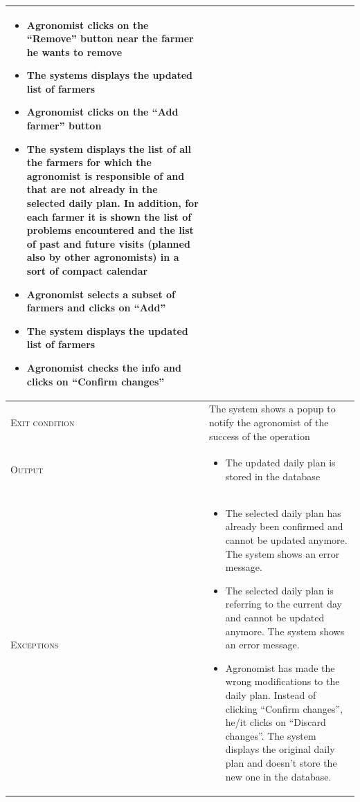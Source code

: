 \begin{table}[H]
\begin{tabular}[c]{|l|p{}|}
\begin{itemize}
                                    		\item Agronomist clicks on the “Remove” button near the farmer he wants to remove
                                            \item The systems displays the updated list of farmers
                                            \item Agronomist clicks on the “Add farmer” button
                                            \item The system displays the list of all the farmers for which the agronomist is responsible of and that are not already in the selected daily plan. In addition, for each farmer it is shown the list of problems encountered and the list of past and future visits (planned also by other agronomists) in a sort of compact calendar
                                            \item Agronomist selects a subset of farmers and clicks on “Add”
                                            \item The system displays the updated list of farmers
                                            \item Agronomist checks the info and clicks on “Confirm changes”

                                        \end{itemize}\\
        \hline %
        \textsc{Exit condition}    &  The system shows a popup to notify the agronomist of the success of the operation
        \\
    	\hline %
    	\textsc{Output}             &  \begin{itemize}
    	    \item The updated daily plan is stored in the database
    	\end{itemize}\\
    	\hline %
    	\textsc{Exceptions}         &  \begin{itemize}
    	    \item The selected daily plan has already been confirmed and cannot be updated anymore. The system shows an error message.
    	    \item The selected daily plan is referring to the current day and cannot be updated anymore. The system shows an error message.
    	    \item Agronomist has made the wrong modifications to the daily plan. Instead of clicking “Confirm changes”, he/it clicks on “Discard changes”. The system displays the original daily plan and doesn’t store the new one in the database.    	\end{itemize}\\
    	

\end{tabular}
\end{table}
